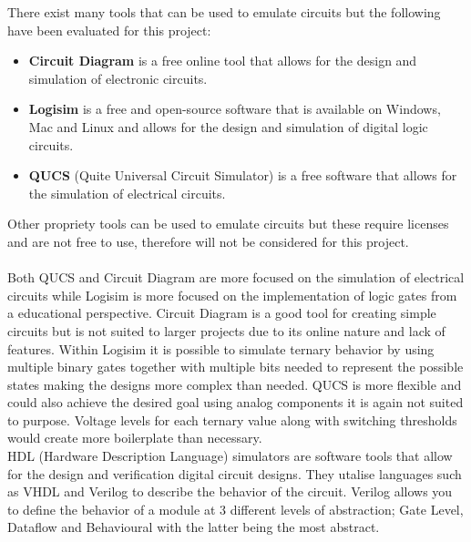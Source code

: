 \documentclass[12pt]{article}
\begin{document}
There exist many tools that can be used to emulate circuits but the following have been evaluated for this project:
\begin{itemize}
    \item \textbf{Circuit Diagram} is a free online tool that allows for the design and simulation of electronic circuits.
    \item \textbf{Logisim} is a free and open-source software that is available on Windows, Mac and Linux and allows for the design and simulation of digital logic circuits.
    \item \textbf{QUCS} (Quite Universal Circuit Simulator) is a free software that allows for the simulation of electrical circuits.
\end{itemize}
Other propriety tools can be used to emulate circuits but these require licenses and are not free to use, 
therefore will not be considered for this project.\\
\\
Both QUCS and Circuit Diagram are more focused on the simulation of electrical circuits while Logisim is more focused on the implementation of 
logic gates from a educational perspective. Circuit Diagram is a good tool for creating simple circuits but is not suited to larger 
projects due to its online nature and lack of features. Within Logisim it is possible to simulate ternary behavior by using multiple binary gates together 
with multiple bits needed to represent the possible states making the designs more complex than needed. QUCS is more flexible and could also 
achieve the desired goal using analog components it is again not suited to purpose. Voltage levels for each ternary value along with switching 
thresholds would create more boilerplate than necessary.\\

HDL (Hardware Description Language) simulators are software tools that allow for the design and verification digital circuit designs. They utalise 
languages such as VHDL and Verilog to describe the behavior of the circuit. Verilog allows you to define the behavior of a module at 3 different 
levels of abstraction; Gate Level, Dataflow and Behavioural with the latter being the most abstract.\\

\newpage

% 
\end{document}
